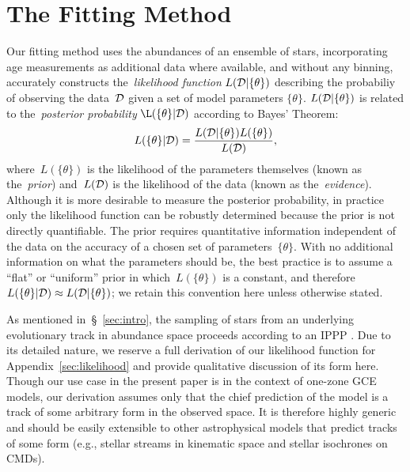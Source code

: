 \documentclass[foo.tex]{subfiles}
\begin{document}
\section{The Fitting Method}
\label{sec:fitting}

Our fitting method uses the abundances of an ensemble of stars, incorporating
age measurements as additional data where available, and without any binning,
accurately constructs the~\textit{likelihood function}
$L(\mathcal{D} | \{\theta\})$ describing the probabiliy of observing the
data~$\mathcal{D}$ given a set of model parameters $\{\theta\}$.
$L(\mathcal{D} | \{\theta\})$ is related to the~\textit{posterior probability}
$\L(\{\theta\} | \script{D})$ according to Bayes' Theorem:
\begin{equation}
L(\{\theta\} | \mathcal{D}) = \frac{
	L(\mathcal{D} | \{\theta\}) L(\{\theta\})
}{
	L(\mathcal{D})
},
\label{eq:bayes}
\end{equation}
where~$L(\{\theta\})$ is the likelihood of the parameters themselves (known as
the~\textit{prior}) and~$L(\mathcal{D})$ is the likelihood of the data (known as
the~\textit{evidence}).
Although it is more desirable to measure the posterior probability, in practice
only the likelihood function can be robustly determined because the prior is
not directly quantifiable.
The prior requires quantitative information independent of the data on the
accuracy of a chosen set of parameters~$\{\theta\}$.
With no additional information on what the parameters should be, the best
practice is to assume a ``flat'' or ``uniform'' prior in which~$L(\{\theta\})$
is a constant, and therefore~$L(\{\theta\} | \mathcal{D}) \approx
L(\mathcal{D} | \{\theta\})$; we retain this convention here unless otherwise
stated.
\par
As mentioned in~\S~\ref{sec:intro}, the sampling of stars from an underlying
evolutionary track in abundance space proceeds according to an IPPP
\citep[e.g.,][]{Press2007}.
Due to its detailed nature, we reserve a full derivation of our likelihood
function for Appendix~\ref{sec:likelihood} and provide qualitative discussion
of its form here.
Though our use case in the present paper is in the context of one-zone GCE
models, our derivation assumes only that the chief prediction of the model is
a track of some arbitrary form in the observed space.
It is therefore highly generic and should be easily extensible to other
astrophysical models that predict tracks of some form (e.g., stellar streams
in kinematic space and stellar isochrones on CMDs).
\par
\end{document}
